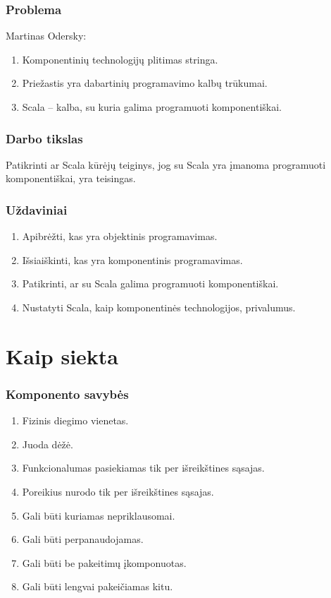 \begin{frame}
  \frametitle{Problema}
  Martinas Odersky:
  \begin{enumerate}
    \item Komponentinių technologijų plitimas stringa.
    \item Priežastis yra dabartinių programavimo kalbų trūkumai.
    \item Scala – kalba, su kuria galima programuoti komponentiškai.
  \end{enumerate}
  \begin{comment}
    Scala kūrėjo Martino Odersky teigimu
  \end{comment}
\end{frame}

\begin{frame}
  \frametitle{Darbo tikslas}
  Patikrinti ar Scala kūrėjų teiginys, jog su Scala yra įmanoma
  programuoti komponentiškai, yra teisingas.
\end{frame}

\begin{frame}
  \frametitle{Uždaviniai}
  \begin{enumerate}
    \item Apibrėžti, kas yra objektinis programavimas.
    \item Išsiaiškinti, kas yra komponentinis programavimas.
    \item Patikrinti, ar su Scala galima programuoti komponentiškai.
    \item Nustatyti Scala, kaip komponentinės technologijos, privalumus.
  \end{enumerate}
\end{frame}

\section{Kaip siekta}

\begin{frame}
  \frametitle{Komponento savybės}
  \begin{enumerate}
    \item Fizinis diegimo vienetas.
    \item Juoda dėžė.
    \item Funkcionalumas pasiekiamas tik per išreikštines sąsajas.
    \item Poreikius nurodo tik per išreikštines sąsajas.
    \item Gali būti kuriamas nepriklausomai.
    \item Gali būti perpanaudojamas.
    \item Gali būti be pakeitimų įkomponuotas.
    \item Gali būti lengvai pakeičiamas kitu.
  \end{enumerate}
\end{frame}


